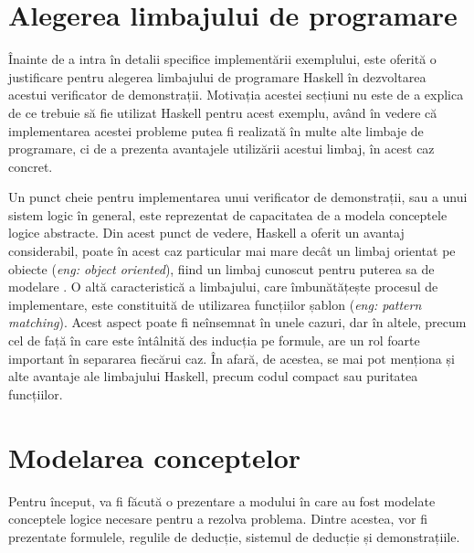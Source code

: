 \documentclass[12pt, openany]{book}
\newcommand{\myenglishterm}[1]{(\textit{eng: #1})}
\begin{document}
        \section{Alegerea limbajului de programare} %
        \label{section_haskell}
            \par{}
                Înainte de a intra în detalii specifice implementării exemplului, este oferită o justificare pentru 
                alegerea limbajului de programare Haskell în dezvoltarea acestui verificator de demonstrații. Motivația acestei 
                secțiuni nu este de a explica de ce trebuie să fie utilizat Haskell pentru acest exemplu, având în vedere că implementarea acestei probleme 
                putea fi realizată în multe alte limbaje de programare, ci de a prezenta avantajele utilizării acestui limbaj, în acest caz concret. 
                
            \par{}
                Un punct cheie pentru implementarea unui 
                verificator de demonstrații, sau a unui sistem logic în general, este reprezentat de capacitatea de a 
                modela conceptele logice abstracte. Din acest punct de vedere, Haskell a oferit un avantaj considerabil,
                poate în acest caz particular mai mare decât un limbaj orientat pe obiecte 
                \myenglishterm{object oriented}, fiind un limbaj cunoscut pentru puterea sa de modelare 
                \cite{haskell_documentation}. O altă caracteristică a limbajului, care îmbunătățește procesul de 
                implementare, este constituită de utilizarea funcțiilor șablon \myenglishterm{pattern 
                matching}. Acest aspect poate fi neînsemnat în unele cazuri, dar în altele, precum cel de față în care 
                este întâlnită des inducția pe formule, are un rol foarte important în separarea fiecărui caz. În afară, 
                de acestea, se mai pot menționa și alte avantaje ale limbajului Haskell, precum codul compact sau 
                puritatea funcțiilor.

        \section{Modelarea conceptelor} %
        \label{section_data_type}
            \par{}
                Pentru început, va fi făcută o prezentare a modului în care au fost modelate conceptele logice necesare 
                pentru a rezolva problema. Dintre acestea, vor fi prezentate formulele, regulile de deducție, sistemul 
                de deducție și demonstrațiile.
\end{document}
